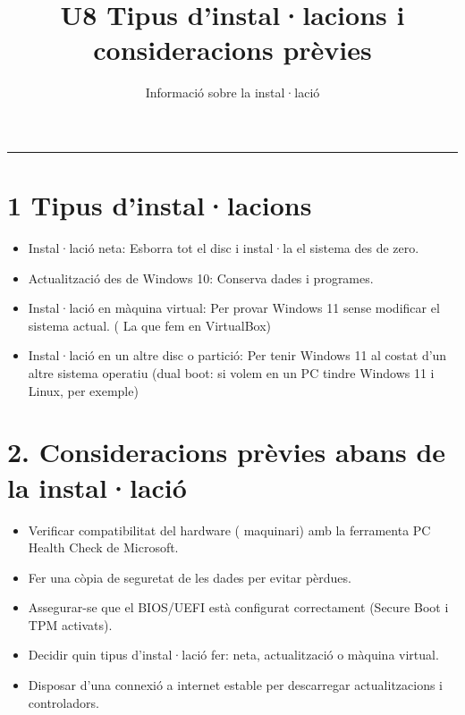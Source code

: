 \documentclass[
  12 pt,
  a4paper,
]{article}
\title{U8 Tipus d'instal·lacions i consideracions prèvies}
\subtitle{Informació sobre la instal·lació}
\author{}
\date{\vspace{-2.5em}}
\begin{document}
\maketitle

{
\setcounter{tocdepth}{2}
\tableofcontents
}
\newpage
\renewcommand\tablename{Tabla}

\begin{center}\rule{0.5\linewidth}{0.5pt}\end{center}

\section{1 Tipus d'instal·lacions}\label{tipus-dinstallacions}

\begin{itemize}
\item
  Instal·lació neta: Esborra tot el disc i instal·la el sistema des de
  zero.
\item
  Actualització des de Windows 10: Conserva dades i programes.
\item
  Instal·lació en màquina virtual: Per provar Windows 11 sense modificar
  el sistema actual. ( La que fem en VirtualBox)
\item
  Instal·lació en un altre disc o partició: Per tenir Windows 11 al
  costat d'un altre sistema operatiu (dual boot: si volem en un PC
  tindre Windows 11 i Linux, per exemple)
\end{itemize}

\section{2. Consideracions prèvies abans de la
instal·lació}\label{consideracions-pruxe8vies-abans-de-la-installaciuxf3}

\begin{itemize}
\item
  Verificar compatibilitat del hardware ( maquinari) amb la ferramenta
  PC Health Check de Microsoft.
\item
  Fer una còpia de seguretat de les dades per evitar pèrdues.
\item
  Assegurar-se que el BIOS/UEFI està configurat correctament (Secure
  Boot i TPM activats).
\item
  Decidir quin tipus d'instal·lació fer: neta, actualització o màquina
  virtual.
\item
  Disposar d'una connexió a internet estable per descarregar
  actualitzacions i controladors.
\end{itemize}
\end{document}
